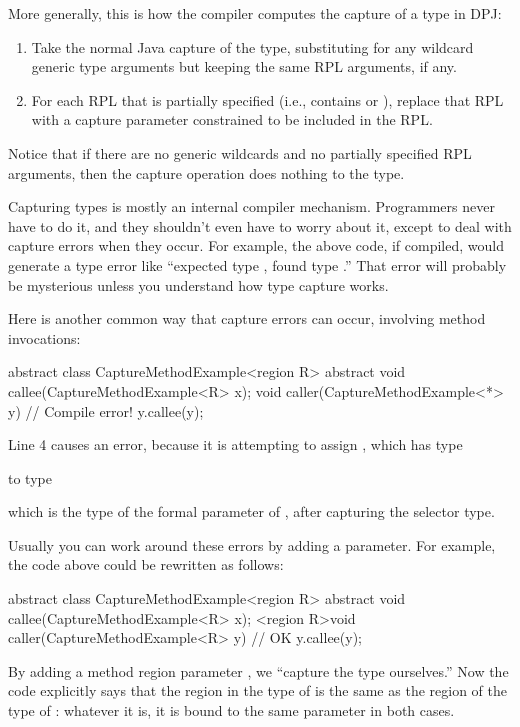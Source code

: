 More generally, this is how the compiler computes the capture of a type
in DPJ:
%
\begin{enumerate}
\item Take the normal Java capture of the type, substituting for any
  wildcard generic type arguments but keeping the same RPL
  arguments, if any.
\item For each RPL that is partially specified (i.e., contains \kwd{*}
  or \kwd{[?]}), replace that RPL with a capture parameter constrained
  to be included in the RPL.
\end{enumerate}
%
Notice that if there are no generic wildcards and no partially
specified RPL arguments, then the capture operation does nothing to
the type.

Capturing types is mostly an internal compiler mechanism.  Programmers
never have to do it, and they shouldn't even have to worry about it,
except to deal with capture errors when they occur.  For example, the
above code, if compiled, would generate a type error like ``expected
type , found type
.''  That error will probably be mysterious
unless you understand how type capture works.

Here is another common way that capture errors can occur, involving
method invocations:
%
\begin{numbereddpjlisting}
abstract class CaptureMethodExample<region R> {
    abstract void callee(CaptureMethodExample<R> x);
    void caller(CaptureMethodExample<*> y) {
        // Compile error!
        y.callee(y);
    }
}
\end{numbereddpjlisting}
%
Line 4 causes an error, because it is attempting to assign ,
which has type 
%
\begin{description}
\item {} 
\end{description}
%
to type 
%
\begin{description}
\item {}
\end{description}
%
which is the type of the formal parameter  of ,
after capturing the selector type.

Usually you can work around these errors by adding a parameter.  For
example, the code above could be rewritten as follows:
%
\begin{numbereddpjlisting}
abstract class CaptureMethodExample<region R> {
    abstract void callee(CaptureMethodExample<R> x);
    <region R>void caller(CaptureMethodExample<R> y) {
        // OK
        y.callee(y);
    }
}
\end{numbereddpjlisting}
%
By adding a method region parameter , we ``capture the type
ourselves.''  Now the code explicitly says that the region in the type
of  is the same as the region of the type of : whatever
it is, it is bound to the same parameter  in both cases.



